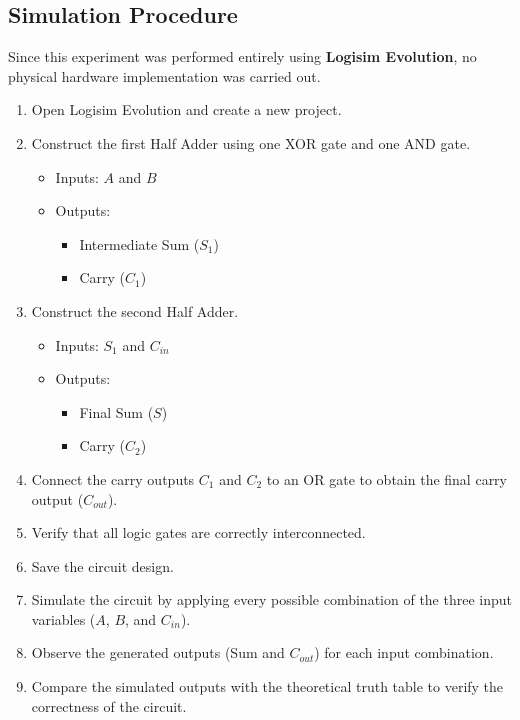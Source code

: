 \documentclass[12pt,a4paper]{article}
\begin{document}
\subsection*{Simulation Procedure}

Since this experiment was performed entirely using \textbf{Logisim Evolution}, no physical hardware implementation was carried out.

\begin{enumerate}

\item Open Logisim Evolution and create a new project.

\item Construct the first Half Adder using one XOR gate and one AND gate.

\begin{itemize}
    \item Inputs: $A$ and $B$
    \item Outputs:
    \begin{itemize}
        \item Intermediate Sum ($S_1$)
        \item Carry ($C_1$)
    \end{itemize}
\end{itemize}

\item Construct the second Half Adder.

\begin{itemize}
    \item Inputs: $S_1$ and $C_{in}$
    \item Outputs:
    \begin{itemize}
        \item Final Sum ($S$)
        \item Carry ($C_2$)
    \end{itemize}
\end{itemize}

\item Connect the carry outputs $C_1$ and $C_2$ to an OR gate to obtain the final carry output ($C_{out}$).

\item Verify that all logic gates are correctly interconnected.

\item Save the circuit design.

\item Simulate the circuit by applying every possible combination of the three input variables ($A$, $B$, and $C_{in}$).

\item Observe the generated outputs (Sum and $C_{out}$) for each input combination.

\item Compare the simulated outputs with the theoretical truth table to verify the correctness of the circuit.

\end{enumerate}
\end{document}
